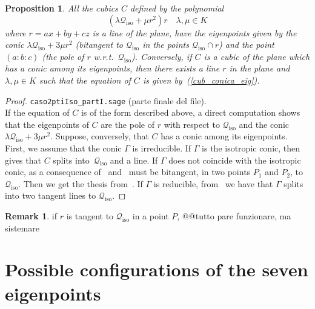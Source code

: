 \documentclass{amsart}
\theoremstyle{plain}
\newtheorem{prop}[lemma]{Proposition}
\theoremstyle{definition}
\newtheorem{rmk}[lemma]{Remark}
\newcommand{\iso}{\mathcal{Q}_{\mathrm{iso}}}
\begin{document}
\begin{prop} All the cubics $C$ defined by the polynomial
\begin{equation}
\label{cub_conica_eig}
(\lambda \iso + \mu r^2)r \quad \mbox{$\lambda, \mu \in K$}
\end{equation}
where $r=ax+by+cz$ is a line of the plane,
have the eigenpoints given by the conic
$\lambda \iso+3\mu r^2$ (bitangent to $\iso$ in the points $\iso \cap r$)
and the point $(a:b:c)$ (the pole of $r$
w.r.t.\ $\iso$). Conversely, if
$C$ is a cubic of the plane which has a conic among its eigenpoints,
then there exists a line $r$ in the plane and $\lambda, \mu \in K$
such that the equation of
$C$ is given by~(\ref{cub_conica_eig}).
\end{prop}
\begin{proof}
\verb+caso2ptiIso_partI.sage+ (parte finale del file).\\
If the equation of $C$ is of the form described above, a direct computation
shows that the eigenpoints of $C$ are the pole of $r$ with respect to $\iso$
and the conic $\lambda \iso+3\mu r^2$. Suppose, conversely, that $C$ has
a conic among its eigenpoints. First, we assume that the conic $\Gamma$
is irreducible. If $\Gamma$ is the isotropic conic,
then~ gives that $C$ splits into~$\iso$ and a line.
If $\Gamma$ does not coincide with the
isotropic conic, as a consequence
of~ and~ must be bitangent,
in two points $P_1$ and $P_2$, to $\iso$. Then we get the thesis
from~. If $\Gamma$ is reducible,
from~ we have that $\Gamma$ splits
into two tangent lines to $\iso$.
\end{proof}
\begin{rmk}
if $r$ is tangent to $\iso$ in a point $P$, @@tutto pare funzionare,
ma sistemare
\end{rmk}



\section{Possible configurations of the seven eigenpoints}
\label{further_alignments}
\end{document}
